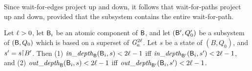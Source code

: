 

\vspace{0.5ex}

Since wait-for-edges project up and down, it follows that wait-for-paths
project up and down, provided that the subsystem contains the entire wait-for-path.

 \label{prop:in-out-projection}
Let $\ell > 0$, let $\mathsf{B}_i$ be an atomic component of $\mathsf{B}$, and let 
$(\mathsf{B}', Q'_0)$ be a subsystem of $(\mathsf{B}, Q_0)$ which is based on a superset of $\mathit{G}_{a}^{2\ell}$.
Let $s$ be a state of $(B, Q_0)$, and $s' = s \pj B'$. Then
(1) $\mathit{in\_depth}_{\mathsf{B}}({\mathsf{B}_i, s}) < 2\ell-1$ iff $\mathit{in\_depth}_{\mathsf{B}'}({\mathsf{B}_i, s'}) < 2\ell-1$, and
(2) $\mathit{out\_depth}_{\mathsf{B}}({\mathsf{B}_i, s}) < 2\ell-1$ iff $\mathit{out\_depth}_{\mathsf{B}'}({\mathsf{B}_i, s'}) < 2\ell-1$.
\ep
{}
%
